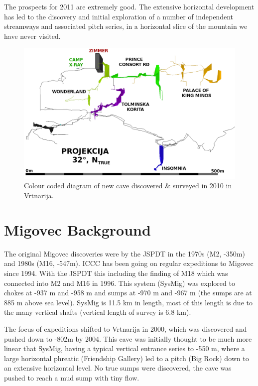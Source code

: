 The prospects for 2011 are extremely good. The extensive horizontal
development has led to the discovery and initial exploration of a
number of independent streamways and associated pitch series, in a
horizontal slice of the mountain we have never visited.

\begin{center}
%
\begin{figure}
\centering
\includegraphics[width=0.85\columnwidth]{2010/overview/2010_deep_vrtnarija_colour_coded_inverted_labelled.png}

\caption{Colour coded diagram of new cave discovered \& surveyed in 2010 in
Vrtnarija.}



\end{figure}

\par\end{center}


\section{Migovec Background}

The original Migovec discoveries were by the JSPDT in the 1970s (M2,
-350m) and 1980s (M16, -547m). ICCC has been going on regular expeditions
to Migovec since 1994. With the JSPDT this including the finding of
M18 which was connected into M2 and M16 in 1996. This system (SysMig)
was explored to chokes at -937 m and -958 m and sumps at -970 m and
-967 m (the sumps are at 885 m above sea level). SysMig is 11.5 km
in length, most of this length is due to the many vertical shafts
(vertical length of survey is 6.8 km).

The focus of expeditions shifted to Vrtnarija in 2000, which was discovered
and pushed down to -802m by 2004. This cave was initially thought
to be much more linear that SysMig, having a typical vertical entrance
series to -550 m, where a large horizontal phreatic (Friendship Gallery)
led to a pitch (Big Rock) down to an extensive horizontal level. No
true sumps were discovered, the cave was pushed to reach a mud sump
with tiny flow.

